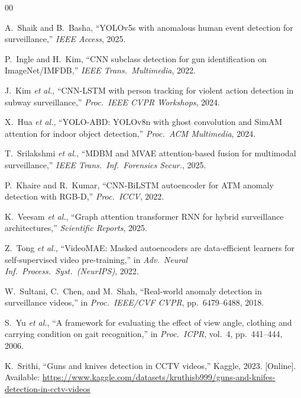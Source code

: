 \documentclass[conference]{IEEEtran}
\begin{document}
\begin{thebibliography}{00}

A.~Shaik and B.~Basha,
``YOLOv5s with anomalous human event detection for surveillance,''
\textit{IEEE Access}, 2025.

P.~Ingle and H.~Kim,
``CNN subclass detection for gun identification on ImageNet/IMFDB,''
\textit{IEEE Trans.\ Multimedia}, 2022.

J.~Kim \textit{et al.},
``CNN-LSTM with person tracking for violent action detection in subway
surveillance,''
\textit{Proc.\ IEEE CVPR Workshops}, 2024.

X.~Hua \textit{et al.},
``YOLO-ABD: YOLOv8n with ghost convolution and SimAM attention for
indoor object detection,''
\textit{Proc.\ ACM Multimedia}, 2024.

T.~Srilakshmi \textit{et al.},
``MDBM and MVAE attention-based fusion for multimodal surveillance,''
\textit{IEEE Trans.\ Inf.\ Forensics Secur.}, 2025.

P.~Khaire and R.~Kumar,
``CNN-BiLSTM autoencoder for ATM anomaly detection with RGB-D,''
\textit{Proc.\ ICCV}, 2022.

K.~Veesam \textit{et al.},
``Graph attention transformer RNN for hybrid surveillance architectures,''
\textit{Scientific Reports}, 2025.

Z.~Tong \textit{et al.},
``VideoMAE: Masked autoencoders are data-efficient learners for
self-supervised video pre-training,''
in \textit{Adv.\ Neural Inf.\ Process.\ Syst.\ (NeurIPS)}, 2022.

W.~Sultani, C.~Chen, and M.~Shah,
``Real-world anomaly detection in surveillance videos,''
in \textit{Proc.\ IEEE/CVF CVPR}, pp.~6479--6488, 2018.

S.~Yu \textit{et al.},
``A framework for evaluating the effect of view angle, clothing and
carrying condition on gait recognition,''
in \textit{Proc.\ ICPR}, vol.~4, pp.~441--444, 2006.

K.~Srithi,
``Guns and knives detection in CCTV videos,''
Kaggle, 2023. [Online]. Available:
\url{https://www.kaggle.com/datasets/kruthisb999/guns-and-knifes-detection-in-cctv-videos}



\end{thebibliography}
\end{document}
